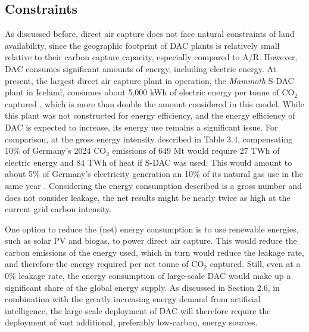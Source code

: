 \subsection{Constraints}
As discussed before, direct air capture does not face natural constraints of land availability, since the geographic footprint of DAC plants is relatively small relative to their carbon capture capacity, especially compared to A/R. However, DAC consumes significant amounts of energy, including electric energy. At present, the largest direct air capture plant in operation, the \textit{Mammoth} S-DAC plant in Iceland, consumes about 5,000 kWh of electric energy per tonne of CO$_2$ captured \parencite{alexandersson_climeworks_2025}, which is more than double the amount considered in this model. While this plant was not constructed for energy efficiency, and the energy efficiency of DAC is expected to increase, its energy use remains a significant issue. For comparison, at the gross energy intensity described in Table 3.4, compensating 10\% of Germany's 2024 CO$_2$ emissions of 649 Mt \parencite{uba_indicator_2025} would  require 27 TWh of electric energy and 84 TWh of heat if S-DAC was used. This would amount to about 5\% of Germany's electricity generation an 10\% of its natural gas use in the same year \parencite{bundesnetzagentur_bundesnetzagentur_2025, bundesnetzagentur_bundesnetzagentur_2025-1}. Considering the energy consumption described is a gross number and does not consider leakage, the net results might be nearly twice as high at the current grid carbon intensity.\vspace{2mm}

One option to reduce the (net) energy consumption is to use renewable energies, such as solar PV and biogas, to power direct air capture. This would reduce the carbon emissions of the energy used, which in turn would reduce the leakage rate, and therefore the energy required per net tonne of CO$_2$ captured. Still, even at a 0\% leakage rate, the energy consumption of large-scale DAC would make up a significant share of the global energy supply. As discussed in Section 2.6, in combination with the greatly increasing energy demand from artificial intelligence, the large-scale deployment of DAC will therefore require the deployment of vast additional, preferably low-carbon, energy sources.